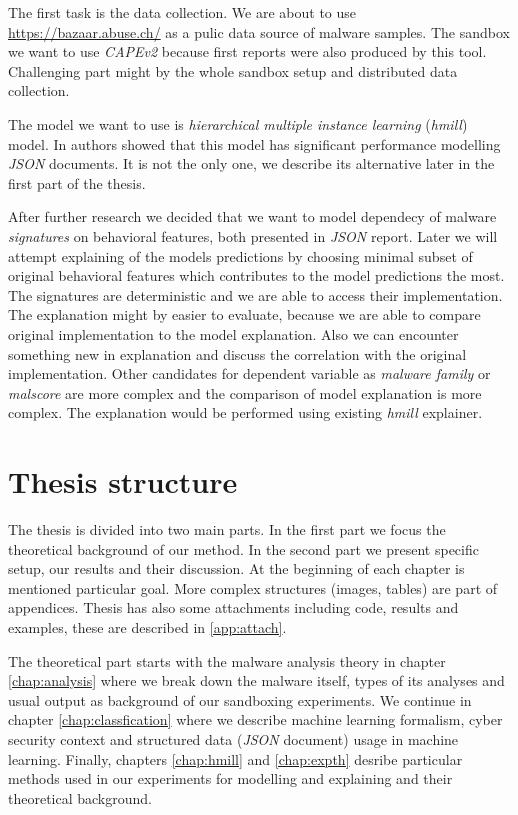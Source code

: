 The first task is the data collection. We are about to use \url{https://bazaar.abuse.ch/} as a pulic data source of malware samples. The sandbox we want to use \emph{CAPEv2} \cite{Cape} because first reports were also produced by this tool. Challenging part might by the whole sandbox setup and distributed data collection.

The model we want to use is \emph{hierarchical multiple instance learning} (\emph{hmill}) model. In \cite{Mandlik2020} authors showed that this model has significant performance modelling \emph{JSON} documents. It is not the only one, we describe its alternative later in the first part of the thesis.

After further research we decided that we want to model dependecy of malware \emph{signatures} on behavioral features, both presented in \emph{JSON} report. Later we will attempt explaining of the models predictions by choosing minimal subset of original behavioral features which contributes to the model predictions the most. The signatures are deterministic and we are able to access their implementation. The explanation might by easier to evaluate, because we are able to compare original implementation to the model explanation. Also we can encounter something new in explanation and discuss the correlation with the original implementation. Other candidates for dependent variable as \emph{malware family} or \emph{malscore} are more complex and the comparison of model explanation is more complex. The explanation would be performed using existing \emph{hmill} explainer.

\section{Thesis structure}
The thesis is divided into two main parts. In the first part we focus the theoretical background of our method. In the second part we present specific setup, our results and their discussion. At the beginning of each chapter is mentioned particular goal. More complex structures (images, tables) are part of appendices. Thesis has also some attachments including code, results and examples, these are described in \ref{app:attach}.

The theoretical part starts with the malware analysis theory in chapter \ref{chap:analysis} where we break down the malware itself, types of its analyses and usual output as background of our sandboxing experiments. We continue in chapter \ref{chap:classfication} where we describe machine learning formalism, cyber security context and structured data (\emph{JSON} document) usage in machine learning. Finally, chapters \ref{chap:hmill} and \ref{chap:expth} desribe particular methods used in our experiments for modelling and explaining and their theoretical background.

